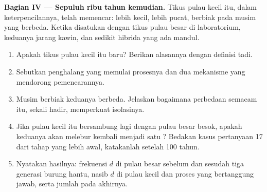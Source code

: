 \begin{problem}
\medskip
\noindent\textbf{Bagian IV --- Sepuluh ribu tahun kemudian.}
Tikus pulau kecil itu, dalam keterpencilannya, telah memencar: lebih
kecil, lebih pucat, berbiak pada musim yang berbeda. Ketika disatukan
dengan tikus pulau besar di laboratorium, keduanya jarang kawin, dan
sedikit hibrida yang ada mandul.
\begin{enumerate}[resume]
  \item Apakah tikus pulau kecil itu  baru? Berikan alasannya
        dengan definisi tadi.
  \item Sebutkan penghalang yang memulai prosesnya dan dua mekanisme
        yang mendorong pemencarannya.
  \item Musim berbiak keduanya berbeda. Jelaskan bagaimana perbedaan
        semacam itu, sekali hadir, memperkuat isolasinya.
  \item Jika pulau kecil itu bersambung lagi dengan pulau besar besok,
        apakah keduanya akan melebur kembali menjadi satu ?
        Bedakan kasus pertanyaan 17 dari tahap yang lebih awal,
        katakanlah setelah 100 tahun.
  \item Nyatakan hasilnya: frekuensi $d$ di pulau besar sebelum dan
        sesudah tiga generasi burung hantu, nasib $d$ di pulau kecil
        dan proses yang bertanggung jawab, serta jumlah  pada
        akhirnya.
\end{enumerate}
\end{problem}
